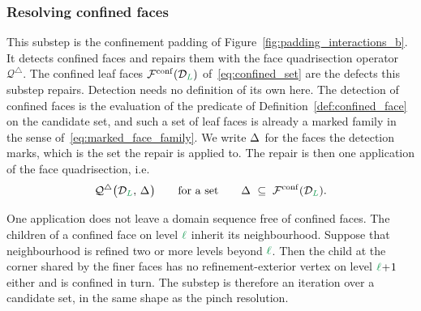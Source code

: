 \documentclass[a4paper, 12pt]{article}
\makeatletter
\newcommand{\quadriF}{\mathcal{Q}^{\triangle}}                   %
\newcommand{\green}{\color{ForestGreen}}
\newcommand{\F}{\mathcal{F}}
\DeclareRobustCommand{\simplexsubsetTwo}[2][]{\Delta\ifx\@empty#1\@empty\else^{#1}\fi_{#2}}
\renewcommand{\l}{{\green\ell}}
\renewcommand{\L}{{\green L}}
\theoremstyle{definition}
\theoremstyle{plain}
\numberwithin{equation}{section}
\DeclareRobustCommand{\domseq}[1][]{\mathcal{D}\ifx\@empty#1\@empty\else_{#1}\fi}
\makeatother
\begin{document}
\subsubsection{Resolving confined faces}
\label{subsubsec:confined_faces}

This substep is the confinement padding of Figure~\ref{fig:padding_interactions_b}. It detects confined faces and repairs them with the face quadrisection operator $\quadriF$. The confined leaf faces $\F^{\mathrm{conf}}(\domseq[\L])$ of~\eqref{eq:confined_set} are the defects this substep repairs.
Detection needs no definition of its own here. The detection of confined faces is the evaluation of the predicate of Definition~\ref{def:confined_face} on the candidate set, and such a set of leaf faces is already a marked family in the sense of~\eqref{eq:marked_face_family}. We write $\simplexsubsetTwo{}$ for the faces the detection marks, which is the set the repair is applied to. The repair is then one application of the face quadrisection, i.e.
\begin{equation}
    \label{eq:confined_faces_resolved_subdiv_partition}
    \quadriF \big( \domseq[\L], \, \simplexsubsetTwo{} \big) \qquad \text{for a set} \qquad \simplexsubsetTwo{} \; \subseteq \; \F^{\mathrm{conf}}(\domseq[\L]) .
\end{equation}

One application does not leave a domain sequence free of confined faces. The children of a confined face on level $\l$ inherit its neighbourhood. Suppose that neighbourhood is refined two or more levels beyond $\l$. Then the child at the corner shared by the finer faces has no refinement-exterior vertex on level $\l \! + \! 1$ either and is confined in turn. The substep is therefore an iteration over a candidate set, in the same shape as the pinch resolution.
\end{document}
